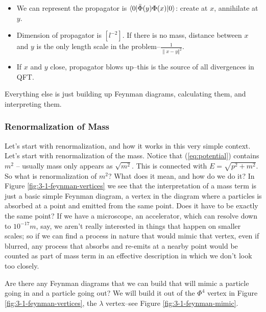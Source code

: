 \documentclass[]{article}
\begin{document}
\begin{itemize}
	\item We can represent the propagator is  $\braket{0|\bar{\Phi}(y)\Phi(x)|0}$: create at $x$, annihilate at $y$.
	\item Dimension of propagator is $[l^{-2}]$. If there is no mass, distance between $x$ and $y$ is the only length scale in the problem--$\frac{1}{\lVert x-y \Vert^2}$. 
	\item If $x$ and $y$ close, propagator blows up--this is the source of all divergences in QFT.
\end{itemize}

Everything else is just building up Feynman diagrams, calculating them, and interpreting them.

\subsubsection{Renormalization of Mass}

Let's start with renormalization, and how it works in this very simple context.
Let's start with renormalization of the mass. Notice that (\ref{eq:potential}) contains $m^2$ -- usually mass only appears as $\sqrt{m^2}$. This is connected with $E=\sqrt{p^2 + m^2}$. So what is renormalization of $m^2$? What does it mean, and how do we do it? In Figure \ref{fig:3-1-feynman-vertices} we see that the interpretation of a mass term is just a basic simple Feynman diagram, a vertex in the diagram where a particles is absorbed at a point and emitted from the same point. Does it have to be exactly the same point? If we have a microscope, an accelerator, which can resolve down to $10^{-17}m$, say, we aren't really interested in things that happen on smaller scales; so if we can find a process in nature that would mimic that vertex,  even if blurred, any process that absorbs and re-emits at a nearby point would be counted as part of mass term in an effective description in which we don't look too closely.

Are there any Feynman diagrams that we can build that will mimic a particle going in and a particle going out? We will build it out of the $\Phi^4$ vertex in Figure \ref{fig:3-1-feynman-vertices}, the $\lambda$ vertex--see Figure \ref{fig:3-1-feynman-mimic}.
\end{document}
